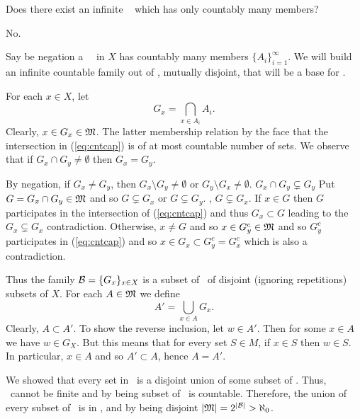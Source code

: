 \begin{enumerate}

\begin{excopy}
Does there exist an infinite \salgebra\ %
which has only countably many members?
\end{excopy}

No.

Say be negation a \salgebra\ \M\ in $X$ %
has countably many members \(\{A_i\}_{i=1}^\infty\).
We will build an infinite countable family out of \M,
mutually disjoint, that will be a base for \M.

For each \(x\in X\), let
\begin{equation} \label{eq:cntcap}
G_x = \bigcap_{x\in A_i} A_i.
\end{equation}
Clearly, \(x\in G_x\in \mathfrak{M}\). The latter membership relation
by the face that the intersection in (\ref{eq:cntcap}) is
of at most countable number of sets.
We observe that if \(G_x \cap G_y \neq \emptyset\)
then \(G_x = G_y\).

By negation, if \(G_x \neq G_y\), then
\(G_x\setminus G_y \neq \emptyset\)
or
\(G_y\setminus G_x \neq \emptyset\).
\(G_x\cap G_y \subsetneq G_y\)
Put \(G = G_x\cap G_y \in \mathfrak{M}\)
and so
\(G\subsetneq G_x\)
or
\(G \subsetneq G_y\).
\Wlogy, \(G \subsetneq G_x\).
If \(x\in G\) then $G$ participates in the intersection of (\ref{eq:cntcap})
and thus \(G_x\subset G\) leading to the \(G_x \subsetneq G_x\) contradiction.
Otherwise, \(x\neq G\) and so \(x \in G_y^c \in \mathfrak{M}\)
and so \(G_y^c\) participates in (\ref{eq:cntcap}) and so
\(x\in G_x \subset G_y^c = G_x^c\) which is also a contradiction.

Thus the family \(\mathcal{B} = \{G_x\}_{x\in X}\) is a subset of \M\
of disjoint (ignoring repetitions) subsets of $X$.
For each \(A\in \mathfrak{M}\) we define
\begin{equation*}
A' = \bigcup_{x\in A} G_x.
\end{equation*}
Clearly, \(A\subset A'\). To show the reverse inclusion,
let \(w\in A'\).
Then for some \(x\in A\) we have \(w \in G_X\).
But this means that for every set \(S\in M\),
if \(x\in S\) then \(w\in S\). In particular, \(x\in A\) and so
\(A'\subset A\), hence \(A=A'\).

We showed that every set in \M\ is a disjoint union
of some subset of \calB.
Thus, \calB\ cannot be finite and by being subset of \M\
is countable. Therefore, the union of every subset of
\calB\ is in \M, and by being disjoint
\(|\mathfrak{M}| = 2^{|\mathcal{B}|} > \aleph_0\).



\end{enumerate}
